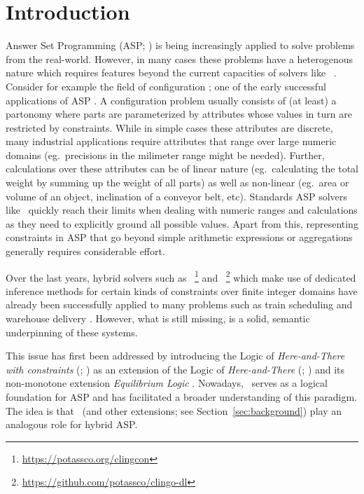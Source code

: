 \section{Introduction}\label{sec:introduction}
Answer Set Programming (ASP; \cite{lifschitz19a}) is being increasingly applied to solve problems from the real-world.
%
However, in many cases these problems have a heterogenous nature which requires features beyond the current capacities of solvers like \clingo\ \cite{gekakasc17a}.
%
Consider for example the field of configuration \cite{kbc14}; one of the early successful applications of ASP \cite{gekasc11c,gescer19a}.
%
A configuration problem usually consists of (at least) a partonomy where parts are parameterized by attributes whose values in turn are restricted by constraints.
%
While in simple cases these attributes are discrete, many industrial applications require attributes
that range over large numeric domains (eg.\ precisions in the milimeter range might be needed).
Further, calculations over these attributes can be of linear nature (eg.\ calculating the total weight by summing up the weight of all parts) as well as
non-linear (eg.\ area or volume of an object, inclination of a conveyor belt, etc).
%
Standards ASP solvers like \clingo\ quickly reach their limits when dealing with numeric ranges and calculations
as they need to explicitly ground all possible values.
Apart from this, representing constraints in ASP that go beyond simple arithmetic expressions or aggregations generally requires considerable effort.

Over the last years, hybrid solvers such as
\clingcon\ \cite{bakaossc16a}\footnote{\url{https://potassco.org/clingcon}} and
\clingodl\ \cite{jakaosscscwa17a}\footnote{\url{https://github.com/potassco/clingo-dl}}
which make use of dedicated inference methods for certain kinds of constraints over finite integer domains
have already been successfully applied to many problems such as train scheduling \cite{abjoossctowa21a} and warehouse delivery \cite{rascwachliso23a}.
%
However, what is still missing, is a solid, semantic underpinning of these systems. %

This issue has first been addressed by introducing the Logic of \emph{Here-and-There with constraints} (\HTC; \cite{cakaossc16a}) as
an extension of the Logic of \emph{Here-and-There} (\HT; \cite{heyting30a}) and its non-monotone extension \emph{Equilibrium Logic} \cite{pearce06a}.
%
Nowadays, \HT\ serves as a logical foundation for ASP and has facilitated a broader understanding of this paradigm.
The idea is that \HTC\ (and other extensions; see Section~\ref{sec:background}) play an analogous role for hybrid ASP.

